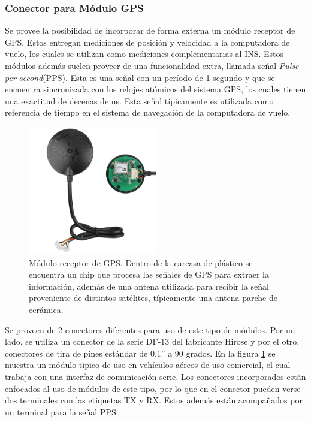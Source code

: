 
\subsubsection{Conector para Módulo GPS}

Se provee la posibilidad de incorporar de forma externa un módulo receptor de GPS. Estos entregan mediciones de posición y velocidad a la computadora de vuelo, los cuales se utilizan como mediciones complementarias al INS. Estos módulos además suelen proveer de una funcionalidad extra, llamada señal \textit{Pulse-per-second}(PPS). Esta es una señal con un período de 1 segundo y que se encuentra sincronizada con los relojes atómicos del sistema GPS, los cuales tienen una exactitud de decenas de ns. Esta señal típicamente es utilizada como referencia de tiempo en el sistema de navegación de la computadora de vuelo.

\begin{figure}[H]
    \centering
    \includegraphics[width=0.5\textwidth]{img/gps.png}
    \caption{Módulo receptor de GPS. Dentro de la carcasa de plástico se encuentra un chip que procesa las señales de GPS para extraer la información, además de una antena utilizada para recibir la señal proveniente de distintos satélites, típicamente una antena parche de cerámica.}
    \label{fig:gps}
\end{figure}

Se proveen de 2 conectores diferentes para uso de este tipo de módulos. Por un lado, se utiliza un conector de la serie DF-13 del fabricante Hirose y por el otro, conectores de tira de pines estándar de 0.1” a 90 grados. En la figura \ref{fig:gps} se muestra un módulo típico de uso en vehículos aéreos de uso comercial, el cual trabaja con una interfaz de comunicación serie. Los conectores incorporados están enfocados al uso de módulos de este tipo, por lo que en el conector pueden verse dos terminales con las etiquetas TX y RX. Estos además están acompañados por un terminal para la señal PPS.

